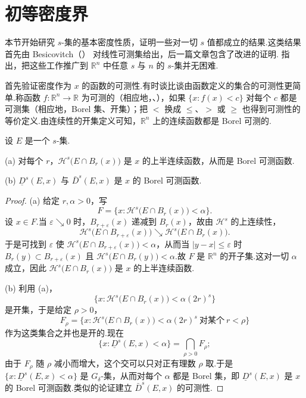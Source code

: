 \section{初等密度界}

本节开始研究 $s$-集的基本密度性质，证明一些对一切 $s$ 值都成立的结果.这类结果首先由 Besicovitch（\citeyear{besicovitch1928a,besicovitch1938}） 对线性可测集给出，后一篇文章包含了改进的证明.\textcite{besicovitch1945a,marstrand1954a,wallin1969} 指出，把这些工作推广到 $\mathbb{R}^n$ 中任意 $s$ 与 $n$ 的 $s$-集并无困难.

首先验证密度作为 $x$ 的函数的可测性.有时谈比谈由函数定义的集合的可测性更简单.称函数 $f:\mathbb{R}^n\to\mathbb{R}$ 为可测的（相应地，、），如果 $\{x:f(x)<c\}$ 对每个 $c$ 都是可测集（相应地，Borel 集、开集）；把 $<$ 换成 $\leq$、$>$ 或 $\geq$ 也得到可测性的等价定义.由连续性的开集定义可知，$\mathbb{R}^n$ 上的连续函数都是 Borel 可测的.

\begin{lemma}\label{lem:2.1}
设 $E$ 是一个 $s$-集.

(a) 对每个 $r$，$\mathcal{H}^s\bigl(E\cap B_r(x)\bigr)$ 是 $x$ 的上半连续函数，从而是 Borel 可测函数.

(b) $\underline{D}^s(E,x)$ 与 $\bar{D}^s(E,x)$ 是 $x$ 的 Borel 可测函数.
\end{lemma}

\begin{proof}
(a) 给定 $r,\alpha>0$，写
\[
  F=\{x:\mathcal{H}^{s}\bigl(E\cap B_r(x)\bigr)<\alpha\}.
\]
设 $x\in F$.当 $\varepsilon\searrow 0$ 时，$B_{r+\varepsilon}(x)$ 递减到 $B_r(x)$，故由 $\mathcal{H}^s$ 的上连续性，
\[
  \mathcal{H}^{s}\bigl(E\cap B_{r+\varepsilon}(x)\bigr)\searrow\mathcal{H}^{s}\bigl(E\cap B_r(x)\bigr).
\]
于是可找到 $\varepsilon$ 使 $\mathcal{H}^s\bigl(E\cap B_{r+\varepsilon}(x)\bigr)<\alpha$，从而当 $|y-x|\leq\varepsilon$ 时 $B_r(y)\subset B_{r+\varepsilon}(x)$ 且 $\mathcal{H}^s\bigl(E\cap B_r(y)\bigr)<\alpha$.故 $F$ 是 $\mathbb{R}^n$ 的开子集.这对一切 $\alpha$ 成立，因此 $\mathcal{H}^s\bigl(E\cap B_r(x)\bigr)$ 是 $x$ 的上半连续函数.

(b) 利用 (a)，
\[
  \{x:\mathcal{H}^{s}\bigl(E\cap B_r(x)\bigr)<\alpha(2r)^{s}\}
\]
是开集，于是给定 $\rho>0$，
\[
  F_{\rho}=\{x:\mathcal{H}^{s}\bigl(E\cap B_r(x)\bigr)<\alpha(2r)^{s}\ \text{对某个}\ r<\rho\}
\]
作为这类集合之并也是开的.现在
\[
  \{x:\underline{D}^{s}(E,x)<\alpha\}=\bigcap_{\rho>0}F_{\rho};
\]
由于 $F_\rho$ 随 $\rho$ 减小而增大，这个交可以只对正有理数 $\rho$ 取.于是 $\{x:\underline{D}^s(E,x)<\alpha\}$ 是 $G_{\delta}$-集，从而对每个 $\alpha$ 都是 Borel 集，即 $\underline{D}^s(E,x)$ 是 $x$ 的 Borel 可测函数.类似的论证建立 $\bar{D}^s(E,x)$ 的可测性.
\end{proof}

